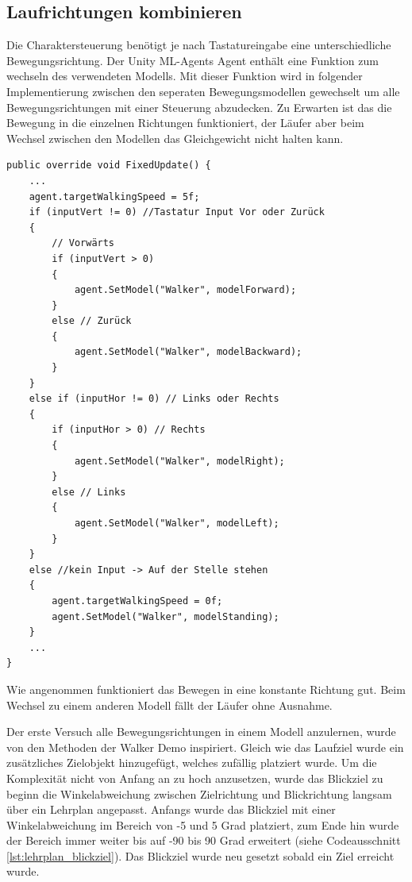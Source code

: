 \subsection{Laufrichtungen kombinieren}
Die Charaktersteuerung benötigt je nach Tastatureingabe eine unterschiedliche Bewegungsrichtung. Der Unity ML-Agents Agent enthält eine Funktion zum wechseln des verwendeten Modells. Mit dieser Funktion wird in folgender Implementierung zwischen den seperaten Bewegungsmodellen gewechselt um alle Bewegungsrichtungen mit einer Steuerung abzudecken. Zu Erwarten ist das die Bewegung in die einzelnen Richtungen funktioniert, der Läufer aber beim Wechsel zwischen den Modellen das Gleichgewicht nicht halten kann.

\begin{lstlisting}[caption={Laufrichtung Modell wechseln},captionpos=b,label={lst:laufrichtung_modell_wechsel}]
public override void FixedUpdate() {
    ...    
    agent.targetWalkingSpeed = 5f;
    if (inputVert != 0) //Tastatur Input Vor oder Zurück
    {
        // Vorwärts
        if (inputVert > 0)
        {
            agent.SetModel("Walker", modelForward);
        }
        else // Zurück
        {
            agent.SetModel("Walker", modelBackward);
        }
    }
    else if (inputHor != 0) // Links oder Rechts
    {
        if (inputHor > 0) // Rechts
        {
            agent.SetModel("Walker", modelRight);
        }
        else // Links
        {
            agent.SetModel("Walker", modelLeft);
        }
    }
    else //kein Input -> Auf der Stelle stehen
    {
        agent.targetWalkingSpeed = 0f;
        agent.SetModel("Walker", modelStanding);
    }
    ...
}
\end{lstlisting}

Wie angenommen funktioniert das Bewegen in eine konstante Richtung gut. Beim Wechsel zu einem anderen Modell fällt der Läufer ohne Ausnahme.

Der erste Versuch alle Bewegungsrichtungen in einem Modell anzulernen, wurde von den Methoden der Walker Demo inspiriert. Gleich wie das Laufziel wurde ein zusätzliches Zielobjekt hinzugefügt, welches zufällig platziert wurde. Um die Komplexität nicht von Anfang an zu hoch anzusetzen, wurde das Blickziel zu beginn die Winkelabweichung zwischen Zielrichtung und Blickrichtung langsam über ein Lehrplan angepasst. Anfangs wurde das Blickziel mit einer Winkelabweichung im Bereich von -5 und 5 Grad platziert, zum Ende hin wurde der Bereich immer weiter bis auf -90 bis 90 Grad erweitert (siehe Codeausschnitt \ref{lst:lehrplan_blickziel}). Das Blickziel wurde neu gesetzt sobald ein Ziel erreicht wurde.

